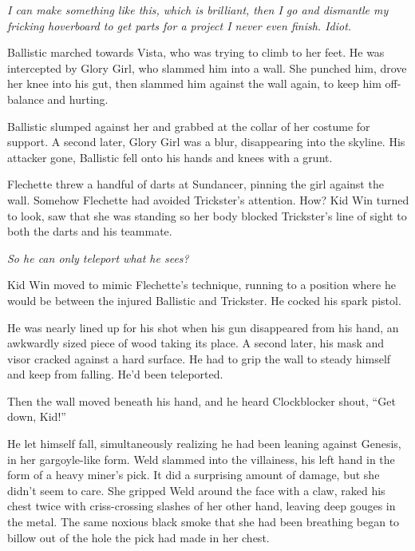 \emph{I can make something like this, which is brilliant, then I go and dismantle my fricking hoverboard to get parts for a project I never even finish.  Idiot.}



Ballistic marched towards Vista, who was trying to climb to her feet.  He was intercepted by Glory Girl, who slammed him into a wall.  She punched him, drove her knee into his gut, then slammed him against the wall again, to keep him off-balance and hurting.



Ballistic slumped against her and grabbed at the collar of her costume for support.  A second later, Glory Girl was a blur, disappearing into the skyline.  His attacker gone, Ballistic fell onto his hands and knees with a grunt.



Flechette threw a handful of darts at Sundancer, pinning the girl against the wall.  Somehow Flechette had avoided Trickster's attention.  How?  Kid Win turned to look, saw that she was standing so her body blocked Trickster's line of sight to both the darts and his teammate.



\emph{So he can only teleport what he sees?}



Kid Win moved to mimic Flechette's technique, running to a position where he would be between the injured Ballistic and Trickster.  He cocked his spark pistol.



He was nearly lined up for his shot when his gun disappeared from his hand, an awkwardly sized piece of wood taking its place.  A second later, his mask and visor cracked against a hard surface.  He had to grip the wall to steady himself and keep from falling.  He'd been teleported.



Then the wall moved beneath his hand, and he heard Clockblocker shout, ``Get down, Kid!''



He let himself fall, simultaneously realizing he had been leaning against Genesis, in her gargoyle-like form.  Weld slammed into the villainess, his left hand in the form of a heavy miner's pick.  It did a surprising amount of damage, but she didn't seem to care.  She gripped Weld around the face with a claw, raked his chest twice with criss-crossing slashes of her other hand, leaving deep gouges in the metal.  The same noxious black smoke that she had been breathing began to billow out of the hole the pick had made in her chest.



